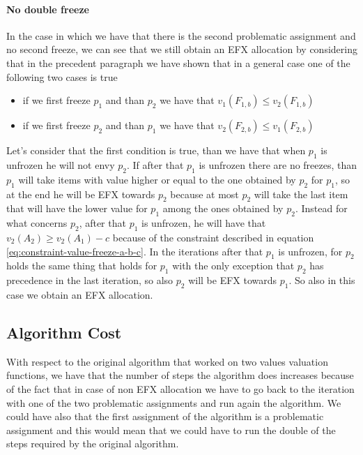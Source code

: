 \documentclass{article}
\begin{document}
\paragraph{No double freeze} In the case in which we have that there is the second problematic assignment and no second freeze, we can see that we still obtain an EFX allocation by considering that in the precedent paragraph we have shown that in a general case one of the following two cases is true
\begin{itemize}
    \item if we first freeze $p_1$ and than $p_2$ we have that $v_1(F_{1,b})\le v_2(F_{1,b})$
    \item if we first freeze $p_2$ and than $p_1$ we have that $v_2(F_{2,b})\le v_1(F_{2,b})$
\end{itemize}
Let's consider that the first condition is true, than we have that when $p_1$ is unfrozen he will not envy $p_2$. If after that $p_1$ is unfrozen there are no freezes, than $p_1$ will take items with value higher or equal to the one obtained by $p_2$ for $p_1$, so at the end he will be EFX towards $p_2$ because at most $p_2$ will take the last item that will have the lower value for $p_1$ among the ones obtained by $p_2$. Instead for what concerns $p_2$, after that $p_1$ is unfrozen, he will have that $v_2(A_2) \ge v_2(A_1) - c$ because of the constraint described in equation \ref{eq:constraint-value-freeze-a-b-c}. In the iterations after that $p_1$ is unfrozen, for $p_2$ holds the same thing that holds for $p_1$ with the only exception that $p_2$ has precedence in the last iteration, so also $p_2$ will be EFX towards $p_1$. So also in this case we obtain an EFX allocation.

\subsection{Algorithm Cost}
With respect to the original algorithm that worked on two values valuation functions, we have that the number of steps the algorithm does increases because of the fact that in case of non EFX allocation we have to go back to the iteration with one of the two problematic assignments and run again the algorithm. We could have also that the first assignment of the algorithm is a problematic assignment and this would mean that we could have to run the double of the steps required by the original algorithm. 



\printbibliography %
\end{document}
